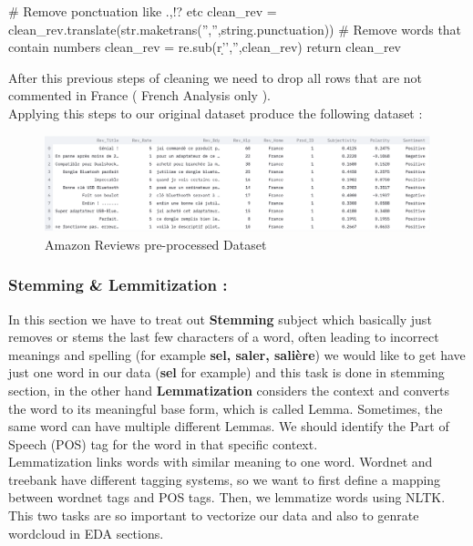 \documentclass{article}
\begin{document}
\begin{enumerate}
\begin{code}
  # Remove ponctuation like .,!? etc
  clean_rev = clean_rev.translate(str.maketrans('','',string.punctuation))
  # Remove words that contain numbers
  clean_rev = re.sub(r'\w*\d\w*','',clean_rev)
  return clean_rev
\end{code}
\noindent
After this previous steps of cleaning we need to drop all rows that are not commented in France ( French Analysis only ).\\
Applying this steps to our original dataset produce the following dataset :
\begin{figure}[H]
    \centering
    \includegraphics[scale=0.42]{src/img/clean_dataset.png}
    \caption{Amazon Reviews pre-processed Dataset}
    \label{fig:my_label}
\end{figure}

\subsubsection{Stemming \& Lemmitization :}
In this section we have to treat out \textbf{Stemming} subject which basically just removes or stems the last few characters of a word, often leading to incorrect meanings and spelling (for example \textbf{sel, saler, salière}) we would like to get have just one word in our data (\textbf{sel} for example) and this task is done in stemming section, in the other hand \textbf{Lemmatization} considers the context and converts the word to its meaningful base form, which is called Lemma. Sometimes, the same word can have multiple different Lemmas. We should identify the Part of Speech (POS) tag for the word in that specific context.\\
Lemmatization links words with similar meaning to one word. Wordnet and treebank have different tagging systems, so we want to first define a mapping between wordnet tags and POS tags. Then, we lemmatize words using NLTK.\\
This two tasks are so important to vectorize our data and also to genrate wordcloud in EDA sections.


\end{enumerate}
\end{document}
